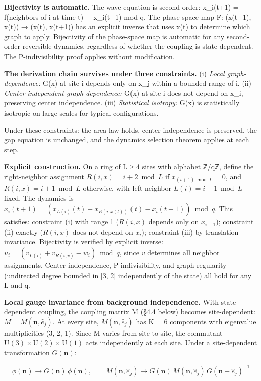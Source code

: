 \documentclass[
]{article}
\begin{document}
\textbf{Bijectivity is automatic.} The wave equation is second-order:
x\_i(t+1) = f(neighbors of i at time t) − x\_i(t−1) mod q. The
phase-space map F: (x(t−1), x(t)) → (x(t), x(t+1)) has an explicit
inverse that uses x(t) to determine which graph to apply. Bijectivity of
the phase-space map is automatic for any second-order reversible
dynamics, regardless of whether the coupling is state-dependent. The
P-indivisibility proof applies without modification.

\textbf{The derivation chain survives under three constraints.} (i)
\emph{Local graph-dependence:} G(x) at site i depends only on x\_j
within a bounded range of i. (ii) \emph{Center-independent
graph-dependence:} G(x) at site i does not depend on x\_i, preserving
center independence. (iii) \emph{Statistical isotropy:} G(x) is
statistically isotropic on large scales for typical configurations.

Under these constraints: the area law holds, center independence is
preserved, the gap equation is unchanged, and the dynamics selection
theorem applies at each step.

\textbf{Explicit construction.} On a ring of L ≥ 4 sites with alphabet
ℤ/qℤ, define the right-neighbor assignment \(R(i, x) = i+2 \bmod L\) if
\(x_{(i+1) \bmod L} = 0\), and \(R(i, x) = i+1 \bmod L\) otherwise, with
left neighbor \(L(i) = i - 1 \bmod L\) fixed. The dynamics is
\(x_i(t+1) = (x_{L(i)}(t) + x_{R(i,x(t))}(t) - x_i(t-1)) \bmod q\). This
satisfies: constraint (i) with range 1 (\(R(i,x)\) depends only on
\(x_{i+1}\)); constraint (ii) exactly (\(R(i,x)\) does not depend on
\(x_i\)); constraint (iii) by translation invariance. Bijectivity is
verified by explicit inverse:
\(u_i = (v_{L(i)} + v_{R(i,v)} - w_i) \bmod q\), since \(v\) determines
all neighbor assignments. Center independence, P-indivisibility, and
graph regularity (undirected degree bounded in {[}3, 2{]} independently
of the state) all hold for any L and q.

\textbf{Local gauge invariance from background independence.} With
state-dependent coupling, the coupling matrix M (§4.4 below) becomes
site-dependent: \(M = M(\mathbf{n}, \hat{e}_j)\). At every site,
\(M(\mathbf{n}, \hat{e}_j)\) has K = 6 components with eigenvalue
multiplicities (3, 2, 1). Since M varies from site to site, the
commutant \(\mathrm{U}(3) \times \mathrm{U}(2) \times \mathrm{U}(1)\)
acts independently at each site. Under a site-dependent transformation
\(G(\mathbf{n})\):

\[\phi(\mathbf{n}) \to G(\mathbf{n})\,\phi(\mathbf{n}), \qquad M(\mathbf{n}, \hat{e}_j) \to G(\mathbf{n})\,M(\mathbf{n}, \hat{e}_j)\,G(\mathbf{n}+\hat{e}_j)^{-1}\]
\end{document}
